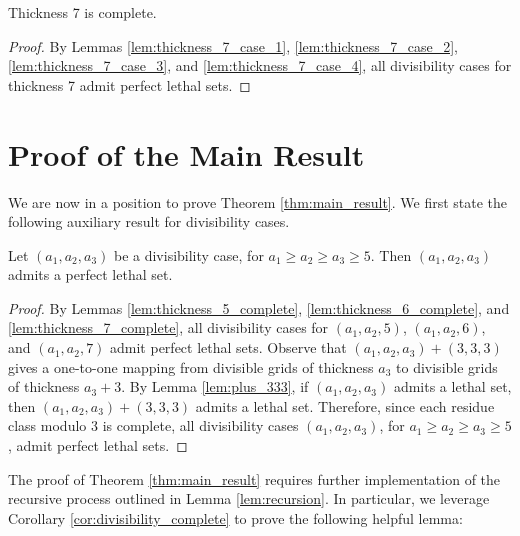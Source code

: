 \begin{lem}
Thickness 7 is complete.
\end{lem}

\begin{proof}
\label{lem:thickness_7_complete}
By Lemmas \ref{lem:thickness_7_case_1}, \ref{lem:thickness_7_case_2}, \ref{lem:thickness_7_case_3}, and \ref{lem:thickness_7_case_4}, all divisibility cases for thickness 7 admit perfect lethal sets.
\end{proof}

\section{Proof of the Main Result}

We are now in a position to prove Theorem \ref{thm:main_result}. We first state the following auxiliary result for divisibility cases. 

\begin{cor}
\label{cor:divisibility_complete}
Let $(a_1,a_2,a_3)$ be a divisibility case, for $a_1 \geq a_2 \geq a_3 \geq 5$. Then $(a_1,a_2,a_3)$ admits a perfect lethal set.
\end{cor}

\begin{proof}
By Lemmas \ref{lem:thickness_5_complete}, \ref{lem:thickness_6_complete}, and \ref{lem:thickness_7_complete}, all divisibility cases for $(a_1,a_2,5)$, $(a_1,a_2,6)$, and $(a_1,a_2,7)$ admit perfect lethal sets. Observe that $(a_1,a_2,a_3) + (3,3,3)$ gives a one-to-one mapping from divisible grids of thickness $a_3$ to divisible grids of thickness $a_3+3$. By Lemma \ref{lem:plus_333}, if $(a_1,a_2,a_3)$ admits a lethal set, then $(a_1,a_2,a_3) + (3,3,3)$ admits a lethal set. Therefore, since each residue class modulo 3 is complete, all divisibility cases $(a_1,a_2,a_3)$, for $a_1 \geq a_2 \geq a_3 \geq 5$, admit perfect lethal sets.
\end{proof}

The proof of Theorem \ref{thm:main_result} requires further implementation of the recursive process outlined in Lemma \ref{lem:recursion}. In particular, we leverage Corollary \ref{cor:divisibility_complete} to prove the following helpful lemma:


